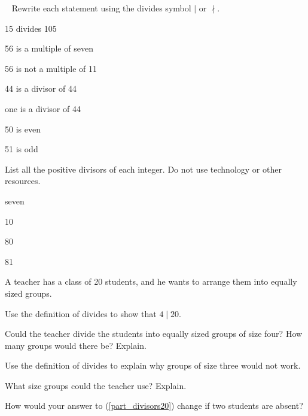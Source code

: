 \begin{exer}[\exerP] %
\label{exer_divides_notation}
~
    Rewrite each statement using the divides symbol $\mid$ or $\nmid$.
    \begin{exerpart}
        \item 15 divides 105
        \item 56 is a multiple of seven
        \item 56 is not a multiple of 11
        \item 44 is a divisor of 44
        \item one is a divisor of 44
        \item 50 is even
        \item 51 is odd
    \end{exerpart}   
\end{exer}

\begin{exer}[\exerP] %
\label{exer_list_divisors}
    List all the positive divisors of each integer.  Do not use technology or other resources.
        \begin{exerpart}
            \item seven
            \item 10
            \item 80
            \item 81
        \end{exerpart}
\end{exer}

\begin{exer}[\exerU] %
\label{exer_prove_divides}  
A teacher has a class of 20 students, and he wants to arrange them into equally sized groups.  
    \begin{exerpart}
        \item Use the definition of divides to show that $4 \mid 20$. 
        \item Could the teacher divide the students into equally sized groups of size four?  How many groups would there be? Explain. 
        \item Use the definition of divides to explain why groups of size three would not work. 
        \item \label{part_divisors20} What size groups could the teacher use?  Explain. 
        \item How would your answer to (\ref{part_divisors20}) change if two students are absent? 
    \end{exerpart}
\end{exer}

